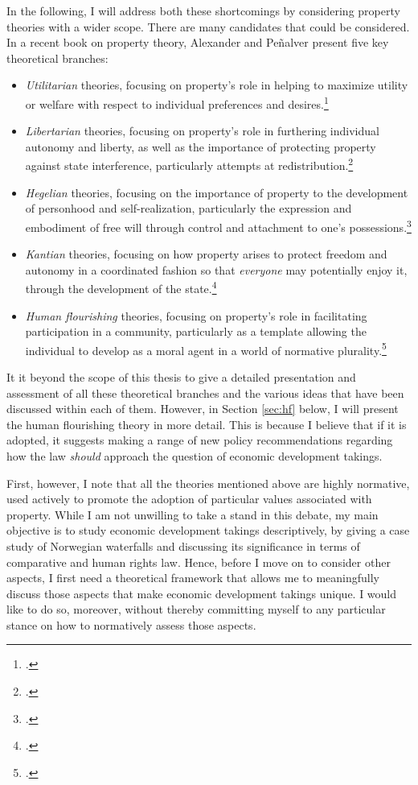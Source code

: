 \documentclass[12pt,a4paper]{book} %
\begin{document}
In the following, I will address both these shortcomings by considering property theories with a wider scope. There are many candidates that could be considered. In a recent book on property theory, Alexander and Pe\~{n}alver present five key theoretical branches: 
\begin{itemize}
\item {\it Utilitarian} theories, focusing on property's role in helping to maximize utility or welfare with respect to individual preferences and desires.\footnote{\cite[Chapter 1]{alexander10}.} 
\item {\it Libertarian} theories, focusing on property's role in furthering individual autonomy and liberty, as well as the importance of protecting property against state interference, particularly attempts at redistribution.\footnote{\cite[Chapter 2]{alexander10}.} 
\item {\it Hegelian} theories, focusing on the importance of property to the development of personhood and self-realization, particularly the expression and embodiment of free will through control and attachment to one's possessions.\footnote{\cite[Chapter 3]{alexander10}.}
\item {\it Kantian} theories, focusing on how property arises to protect freedom and autonomy in a coordinated fashion so that {\it everyone} may potentially enjoy it, through the development of the state.\footnote{\cite[Chapter 4]{alexander10}.}
\item {\it  Human flourishing} theories, focusing on property's role in facilitating participation in a community, particularly as a template allowing the individual to develop as a moral agent in a world of normative plurality.\footnote{\cite[Chapter 5]{alexander10}.}
\end{itemize}

It it beyond the scope of this thesis to give a detailed presentation and assessment of all these theoretical branches and the various ideas that have been discussed within each of them. However, in Section \ref{sec:hf} below, I will present the human flourishing theory in more detail. This is because I believe that if it is adopted, it suggests making a range of new policy recommendations regarding how the law {\it should} approach the question of economic development takings. 

First, however, I note that all the theories mentioned above are highly normative, used actively to promote the adoption of particular values associated with property. While I am not unwilling to take a stand in this debate, my main objective is to study economic development takings descriptively, by giving a case study of Norwegian waterfalls and discussing its significance in terms of comparative and human rights law. Hence, before I move on to consider other aspects, I first need a theoretical framework that allows me to meaningfully discuss those aspects that make economic development takings unique. I would like to do so, moreover, without thereby committing myself to any particular stance on how to normatively assess those aspects. 
\end{document}
